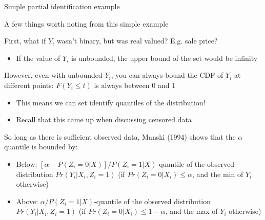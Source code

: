 \documentclass[notes,11pt, aspectratio=169]{beamer}
\newenvironment{wideitemize}{\itemize\addtolength{\itemsep}{10pt}}{\enditemize}
\begin{document}
\begin{frame}{Simple partial identification example}
  \begin{wideitemize}
  \item A few things worth noting from this simple example
  \item First, what if $Y_{i}$ wasn't binary, but was real valued?
    E.g. sale price?
    \begin{itemize}
    \item If the value of $Y_{i}$ is unbounded, the upper bound of the
      set would be infinity
    \end{itemize}
    \item However, even with unbounded $Y_{i}$, you can always bound
      the CDF of $Y_{i}$ at different points: $F(Y_{i} \leq t)$ is
      always between 0 and 1
      \begin{itemize}
      \item This means we can set identify quantiles of the distribution!
      \item Recall that this came up when discussing censored data
      \end{itemize}
    \item So long as there is sufficient observed data, Manski (1994)
      shows that the $\alpha$ quantile is bounded by:
      \begin{itemize}
      \item Below:  $[\alpha - P(Z_{i} = 0 | X)] / P(Z_{i} = 1 | X)$-quantile of
        the observed distribution $Pr(Y_{i} | X_{i}, Z_{i} = 1)$ (if $Pr(Z_{i} = 0 | X_{i}) \leq \alpha$, and the min of $Y_{i}$ otherwise)
      \item Above:  $\alpha / P(Z_{i} = 1 | X)$-quantile of
        the observed distribution $Pr(Y_{i} | X_{i}, Z_{i} = 1)$ (if $Pr(Z_{i} = 0 | X_{i}) \leq 1- \alpha$, and the max of $Y_{i}$ otherwise)
      \end{itemize}
  \end{wideitemize}
\end{frame}
\end{document}
